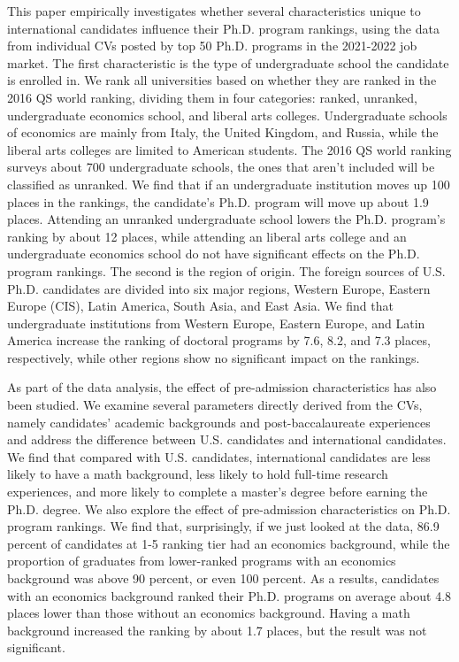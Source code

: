 \documentclass[12pt]{article}
\begin{document}
This paper empirically investigates whether several characteristics unique to international candidates influence their Ph.D. program rankings, using the data from individual CVs posted by top 50 Ph.D. programs in the 2021-2022 job market. The first characteristic is the type of undergraduate school the candidate is enrolled in. We rank all universities based on whether they are ranked in the 2016 QS world ranking, dividing them in four categories: ranked, unranked, undergraduate economics school, and liberal arts colleges. Undergraduate schools of economics are mainly from Italy, the United Kingdom, and Russia, while the liberal arts colleges are limited to American students. The 2016 QS world ranking surveys about 700 undergraduate schools, the ones that aren't included will be classified as unranked. We find that if an undergraduate institution moves up 100 places in the rankings, the candidate's Ph.D. program will move up about 1.9 places. Attending an unranked undergraduate school lowers the Ph.D. program's ranking by about 12 places,  while attending an liberal arts college and an undergraduate economics school do not have significant effects on the Ph.D. program rankings. The second is the region of origin. The foreign sources of U.S. Ph.D. candidates are divided into six major regions, Western Europe, Eastern Europe (CIS), Latin America, South Asia, and East Asia. We find that undergraduate institutions from Western Europe, Eastern Europe, and Latin America increase the ranking of doctoral programs by 7.6, 8.2, and 7.3 places, respectively, while other regions show no significant impact on the rankings.

As part of the data analysis, the effect of pre-admission characteristics has also been studied. We examine several parameters directly derived from the CVs, namely candidates' academic backgrounds and post-baccalaureate experiences and address the difference between U.S. candidates and international candidates. We find that compared with U.S. candidates, international candidates are less likely to have a math background, less likely to hold full-time research experiences, and more likely to complete a master's degree before earning the Ph.D. degree. We also explore the effect of pre-admission characteristics on Ph.D. program rankings. We find that, surprisingly, if we just looked at the data, 86.9 percent of candidates at 1-5 ranking tier had an economics background, while the proportion of graduates from lower-ranked programs with an economics background was above 90 percent, or even 100 percent. As a results, candidates with an economics background ranked their Ph.D. programs on average about 4.8 places lower than those without an economics background. Having a math background increased the ranking by about 1.7 places, but the result was not significant.
\end{document}
